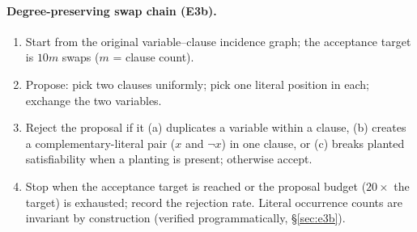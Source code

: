 \documentclass[pdflatex,sn-basic,Numbered]{sn-jnl}
\begin{document}
\begin{appendices}
\paragraph{Degree-preserving swap chain (E3b).}
\begin{enumerate}
    \item Start from the original variable--clause incidence graph; the
    acceptance target is $10m$ swaps ($m$ = clause count).
    \item Propose: pick two clauses uniformly; pick one literal position in
    each; exchange the two variables.
    \item Reject the proposal if it (a) duplicates a variable within a
    clause, (b) creates a complementary-literal pair ($x$ and $\neg x$) in
    one clause, or (c) breaks planted satisfiability when a planting is
    present; otherwise accept.
    \item Stop when the acceptance target is reached or the proposal budget
    ($20\times$ the target) is exhausted; record the rejection rate.
    Literal occurrence counts are invariant by construction (verified
    programmatically, \S\ref{sec:e3b}).
\end{enumerate}

\end{appendices}


\end{document}
